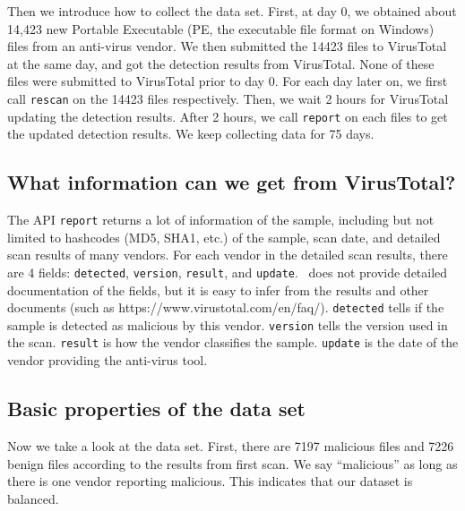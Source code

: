 Then we introduce how to collect the data set. 
First, at day 0, we obtained about 14,423 new Portable Executable (PE, the executable file format on Windows) files from an anti-virus vendor. 
We then submitted the 14423 files to VirusTotal at the same day, and got the detection results from VirusTotal. 
None of these files were submitted to VirusTotal prior to day 0.
For each day later on, we first call \texttt{rescan} on the 14423 files respectively. Then, we wait 2 hours for VirusTotal updating the detection results. 
After 2 hours, we call \texttt{report} on each files to get the updated detection results. 
We keep collecting data for 75 days. 


\subsection{What information can we get from VirusTotal?}%

The API \texttt{report} returns a lot of information of the sample, including but not limited to hashcodes (MD5, SHA1, etc.) of the sample, scan date, and detailed scan results of many vendors. For each vendor in the detailed scan results, there are 4 fields: \texttt{detected}, \texttt{version}, \texttt{result}, and \texttt{update}. \vt\ does not provide detailed documentation of the fields, but it is easy to infer from the results and other documents (such as https://www.virustotal.com/en/faq/). \texttt{detected} tells if the sample is detected as malicious by this vendor. \texttt{version} tells the version used in the scan. \texttt{result} is how the vendor classifies the sample. \texttt{update} is the date of the vendor providing the anti-virus tool.

\subsection{Basic properties of the data set}

Now we take a look at the data set. First, there are 7197 malicious files and 7226 benign files according to the results from first scan. We say ``malicious'' as long as there is one vendor reporting malicious. This indicates that our dataset is balanced.

